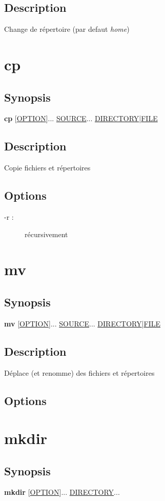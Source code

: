 \documentclass[a4paper, 10pt, onecolumn, openright, oneside]{book}
\begin{document}
\subsection{Description}
Change de répertoire (par defaut \emph{home})

\section{cp}
\subsection{Synopsis}
\textbf{cp} [\ul{OPTION}]... \ul{SOURCE}... \ul{DIRECTORY}|\ul{FILE}
\subsection{Description}
Copie fichiers et répertoires
\subsection{Options}
\begin{description}
\item[-r :] récursivement
\end{description}

\section{mv}
\subsection{Synopsis}
\textbf{mv} [\ul{OPTION}]... \ul{SOURCE}... \ul{DIRECTORY}|\ul{FILE}
\subsection{Description}
Déplace (et renomme) des fichiers et répertoires
\subsection{Options}

\section{mkdir}
\subsection{Synopsis}
\textbf{mkdir} [\ul{OPTION}]... \ul{DIRECTORY}...
\end{document}
